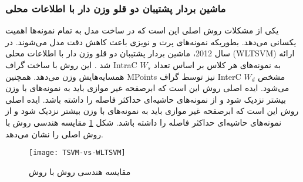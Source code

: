 \subsubsection{ماشین بردار پشتیبان دو قلو وزن دار با اطلاعات محلی }\label{sec:2:2:3:3}
یکی از مشکلات روش  اصلی این است که در ساخت مدل به تمام نمونه‌ها اهمیت یکسانی می‌دهد. بطوریکه نمونه‌های پرت و نویزی باعث کاهش دقت مدل می‌شوند. در سال 2012، ماشین بردار پشتیبان دو قلو وزن دار با اطلاعات محلی (\gls*{WLTSVM}) ارائه شد \cite{ye2012}. این روش با ساخت گراف \gls{IntraC} $W_{s}$  به نمونه‌های هر کلاس بر اساس تعداد همسایه‌هایش وزن می‌دهد. همچنین \glspl{MPoint}  نیز توسط گراف \gls{InterC} $W_d$ مشخص می‌شود. ایده اصلی روش  این است که ابرصفحه غیر موازی باید به نمونه‌های با وزن بیشتر نزدیک شود و از نمونه‌های حاشیه‌ای حداکثر فاصله را داشته باشد. ایده اصلی روش  این است که ابرصفحه غیر موازی باید به نمونه‌های با وزن بیشتر نزدیک شود و از نمونه‌های حاشیه‌ای حداکثر فاصله را داشته باشد. شکل \ref{fig:TSVM-WLTSVM} مقایسه هندسی روش  با روش  اصلی را نشان می‌دهد.   

\begin{figure}[!t]
	\centering
	\texttt{[image: TSVM-vs-WLTSVM]}
	\caption{مقایسه هندسی روش  با روش  }
	\label{fig:TSVM-WLTSVM}
\end{figure}

